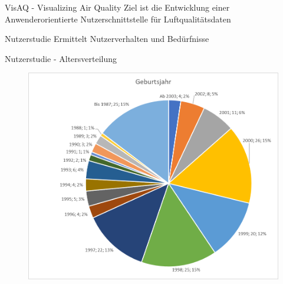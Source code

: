 \begin{frame}{VisAQ - Visualizing Air Quality}
    Ziel ist die Entwicklung einer Anwenderorientierte Nutzerschnittstelle für Luftqualitätsdaten
\end{frame}
\begin{frame}{Nutzerstudie}
    Ermittelt Nutzerverhalten und Bedürfnisse
\end{frame}
\begin{frame}{Nutzerstudie - Altersverteilung}
    \begin{figure}[h]
        \includegraphics[height=0.7\textheight]{../../media/diagram/geburtsjahr}
    \end{figure}
\end{frame}
